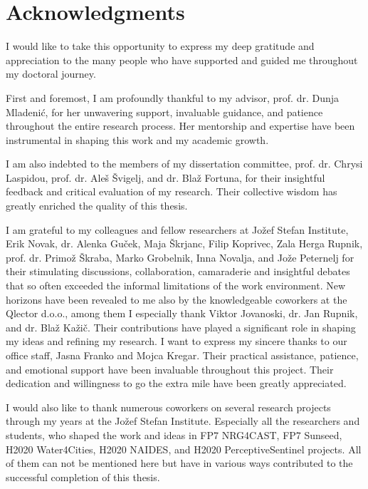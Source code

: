 % 
\chapter*{Acknowledgments}

I would like to take this opportunity to express my deep gratitude and appreciation to the many people who have supported and guided me throughout my doctoral journey.

First and foremost, I am profoundly thankful to my advisor, prof. dr. Dunja Mladenić, for her unwavering support, invaluable guidance, and patience throughout the entire research process. 
Her mentorship and expertise have been instrumental in shaping this work and my academic growth.

I am also indebted to the members of my dissertation committee, prof. dr. Chrysi Laspidou, prof. dr. Aleš Švigelj, and dr. Blaž Fortuna, for their insightful feedback and critical evaluation of my research.
Their collective wisdom has greatly enriched the quality of this thesis.

I am grateful to my colleagues and fellow researchers at Jožef Stefan Institute, Erik Novak, dr. Alenka Guček, Maja Škrjanc, Filip Koprivec, Zala Herga Rupnik, prof. dr. Primož Škraba, Marko Grobelnik, Inna Novalja, and Jože Peternelj for their stimulating discussions, collaboration, camaraderie and insightful debates that so often exceeded the informal limitations of the work environment.
New horizons have been revealed to me also by the knowledgeable coworkers at the Qlector d.o.o., among them I especially thank Viktor Jovanoski, dr. Jan Rupnik, and dr. Blaž Kažič.
Their contributions have played a significant role in shaping my ideas and refining my research.
I want to express my sincere thanks to our office staff, Jasna Franko and Mojca Kregar.
Their practical assistance, patience, and emotional support have been invaluable throughout this project.
Their dedication and willingness to go the extra mile have been greatly appreciated.

I would also like to thank numerous coworkers on several research projects through my years at the Jožef Stefan Institute. 
Especially all the researchers and students, who shaped the work and ideas in FP7 NRG4CAST, FP7 Sunseed, H2020 Water4Cities, H2020 NAIDES, and H2020 PerceptiveSentinel projects.
All of them can not be mentioned here but have in various ways contributed to the successful completion of this thesis. 

